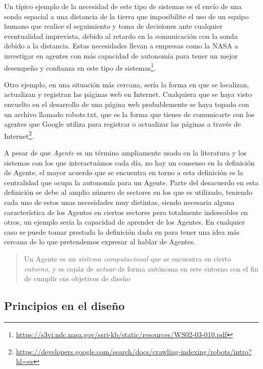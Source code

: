 Un típico ejemplo de la necesidad de este tipo de sistemas es el envío de una sonda espacial a una distancia de la tierra que imposibilite el uso de un equipo humano que realice el seguimiento y toma de decisiones ante cualquier eventualidad imprevista, debido al retardo en la comunicación con la sonda debido a la distancia. Estas necesidades llevan a empresas como la NASA a investigar en agentes con más capacidad de autonomía para tener un mejor desempeño y confianza en este tipo de sistemas\footnote{\url{https://s3vi.ndc.nasa.gov/ssri-kb/static/resources/WS02-03-010.pdf}}.

Otro ejemplo, en una situación más cercana, sería la forma en que se localizan, actualizan y registran las páginas web en Internet. Cualquiera que se haya visto envuelto en el desarrollo de una página web probablemente se haya topado con un archivo llamado robots.txt, que es la forma que tienes de comunicarte con los agentes que Google utiliza para registrar o actualizar las páginas a través de Internet\footnote{\url{https://developers.google.com/search/docs/crawling-indexing/robots/intro?hl=es}}.

A pesar de que \textit{Agente} es un término ampliamente usado en la literatura y los sistemas con los que interactuámos cada día, no hay un consenso en la definición de Agente, el mayor acuerdo que se encuentra en torno a esta definición es la centralidad que ocupa la autonomía para un Agente. Parte del desacuerdo en esta definición se debe al amplio número de sectores en los que es utilizado, teniendo cada uno de estos unas necesidades muy distintas, siendo necesaria alguna característica de los Agentes en ciertos sectores pero totalmente indeseables en otros, un ejemplo sería la capacidad de aprender de los Agentes. En cualquier caso se puede tomar prestada la definición dada en \cite{weiss1999multiagent} para tener una idea más cercana de lo que pretendemos expresar al hablar de Agentes.

\begin{quote}
Un Agente es un \textit{sistema computacional} que se encuentra en cierto \textit{entorno}, y es capáz de \textit{actuar} de forma autónoma en este entorno con el fin de cumplir sus objetivos de diseño
\end{quote}

\subsection{Principios en el diseño}


